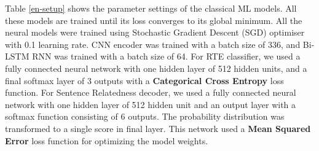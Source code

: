 \documentclass[12pt]{report} %
\begin{document}
 Table \ref{en-setup} shows the parameter settings of the classical ML models. All these models are trained until its loss converges to its global minimum. All the neural models were trained using Stochastic Gradient Descent (SGD) optimiser with 0.1 learning rate. CNN encoder was trained with a batch size of 336, and Bi-LSTM RNN was trained with a batch size of 64. For RTE classifier,  we used a fully connected neural network with one hidden layer of 512 hidden units, and a final softmax layer of 3 outputs with a \textbf{Categorical Cross Entropy} loss function. For Sentence Relatedness decoder, we used a fully connected neural network with one hidden layer of 512 hidden unit and an output layer with a softmax function consisting of 6 outputs. The probability distribution was transformed to a single score in final layer. This network used a \textbf{Mean Squared Error} loss function for optimizing the model weights. 
\end{document}
